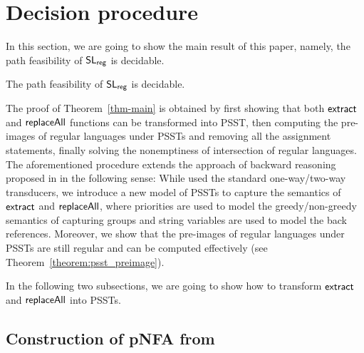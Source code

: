 
\section{Decision procedure} \label{sec:decision}

In this section, we are going to show the main result of this paper, namely, the path feasibility of $\mathsf{SL}_{\sf reg}$ is decidable.

\begin{theorem}\label{thm-main}
The path feasibility of $\mathsf{SL}_{\sf reg}$ is decidable.
\end{theorem}

The proof of Theorem~\ref{thm-main} is obtained by first showing that both $\mathsf{extract}$ and $\mathsf{replaceAll}$ functions can be transformed into PSST, then computing the pre-images of regular languages under PSSTs and removing all the assignment statements, finally solving the nonemptiness of intersection of regular languages. The aforementioned procedure extends the approach of backward reasoning proposed in \cite{CCH+18,CHL+19} in the following sense: While \cite{CCH+18,CHL+19} used the standard one-way/two-way transducers, we introduce a new model of PSSTs to capture the semantics of $\mathsf{extract}$ and $\mathsf{replaceAll}$, where priorities are used to model the greedy/non-greedy semantics of capturing groups and string variables are used to model the back references. Moreover, we show that the pre-images of regular languages under PSSTs are still regular and can be computed effectively (see Theorem~\ref{theorem:psst_preimage}).


In the following two subsections, we are going to show how to transform $\mathsf{extract}$ and $\mathsf{replaceAll}$ into PSSTs.




\subsection{Construction of pNFA from \regexp[\sf CG]}
\label{construction:pnfa}

